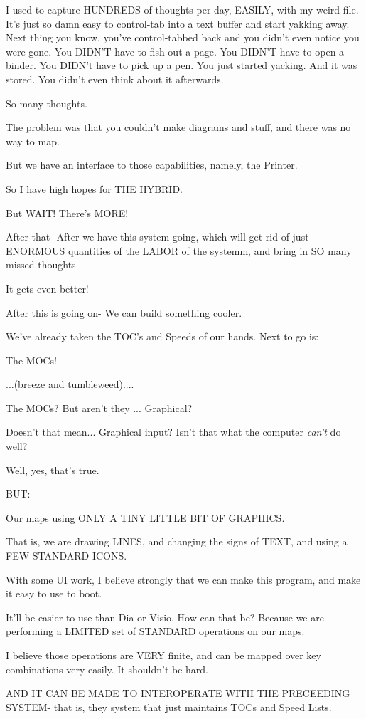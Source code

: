 \documentclass[oneside]{book}
\begin{document}
I used to capture HUNDREDS of thoughts per day, EASILY, with my weird
file. It's just so damn easy to control-tab into a text buffer and
start yakking away. Next thing you know, you've control-tabbed back
and you didn't even notice you were gone. You DIDN'T have to fish out
a page. You DIDN'T have to open a binder. You DIDN't have to pick up a
pen. You just started yacking. And it was stored. You didn't even
think about it afterwards.

So many thoughts.

The problem was that you couldn't make diagrams and stuff, and there
was no way to map.

But we have an interface to those capabilities, namely, the Printer.

So I have high hopes for THE HYBRID.

But WAIT! There's MORE!

After that- After we have this system going, which will get rid of
just ENORMOUS quantities of the LABOR of the systemm, and bring in SO
many missed thoughts-

It gets even better!

After this is going on- We can build something cooler.

We've already taken the TOC's and Speeds of our hands. Next to go is:

The MOCs!

...(breeze and tumbleweed)....

The MOCs? But aren't they ... Graphical?

Doesn't that mean... Graphical input?
Isn't that what the computer \emph{can't} do well?

Well, yes, that's true.

BUT:

Our maps using ONLY A TINY LITTLE BIT OF GRAPHICS.

That is, we are drawing LINES, and changing the signs of TEXT, and
using a FEW STANDARD ICONS.

With some UI work, I believe strongly that we can make this program,
and make it easy to use to boot.

It'll be easier to use than Dia or Visio. How can that be? Because we
are performing a LIMITED set of STANDARD operations on our maps.

I believe those operations are VERY finite, and can be mapped over key
combinations very easily. It shouldn't be hard.

AND IT CAN BE MADE TO INTEROPERATE WITH THE PRECEEDING SYSTEM- that
is, they system that just maintains TOCs and Speed Lists.
\end{document}
